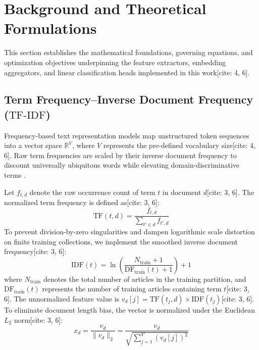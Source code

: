 \documentclass[11pt,a4paper]{article}
\begin{document}
	\section{Background and Theoretical Formulations}
	\label{sec:background}
	
	This section establishes the mathematical foundations, governing equations, and optimization objectives underpinning the feature extractors, embedding aggregators, and linear classification heads implemented in this work[cite: 4, 6].
	
	\subsection{Term Frequency--Inverse Document Frequency (\texorpdfstring{$\text{TF-IDF}$}{TF-IDF})}
	Frequency-based text representation models map unstructured token sequences into a vector space $\mathbb{R}^V$, where $V$ represents the pre-defined vocabulary size[cite: 4, 6]. Raw term frequencies are scaled by their inverse document frequency to discount universally ubiquitous words while elevating domain-discriminative terms \cite{salton1988term}.
	
	Let $f_{t, d}$ denote the raw occurrence count of term $t$ in document $d$[cite: 3, 6]. The normalized term frequency is defined as[cite: 3, 6]:
	\begin{equation}
		\text{TF}(t, d) = \frac{f_{t, d}}{\sum_{t' \in d} f_{t', d}}
		\label{eq:tf}
	\end{equation}
	To prevent division-by-zero singularities and dampen logarithmic scale distortion on finite training collections, we implement the smoothed inverse document frequency[cite: 3, 6]:
	\begin{equation}
		\text{IDF}(t) = \ln\left(\frac{N_{\text{train}} + 1}{\text{DF}_{\text{train}}(t) + 1}\right) + 1
		\label{eq:idf}
	\end{equation}
	where $N_{\text{train}}$ denotes the total number of articles in the training partition, and $\text{DF}_{\text{train}}(t)$ represents the number of training articles containing term $t$[cite: 3, 6]. The unnormalized feature value is $v_d[j] = \text{TF}(t_j, d) \times \text{IDF}(t_j)$[cite: 3, 6]. To eliminate document length bias, the vector is normalized under the Euclidean $L_2$ norm[cite: 3, 6]:
	\begin{equation}
		x_d = \frac{v_d}{\|v_d\|_2} = \frac{v_d}{\sqrt{\sum_{j=1}^{V} (v_d[j])^2}}
		\label{eq:l2_norm}
	\end{equation}
	
\end{document}
